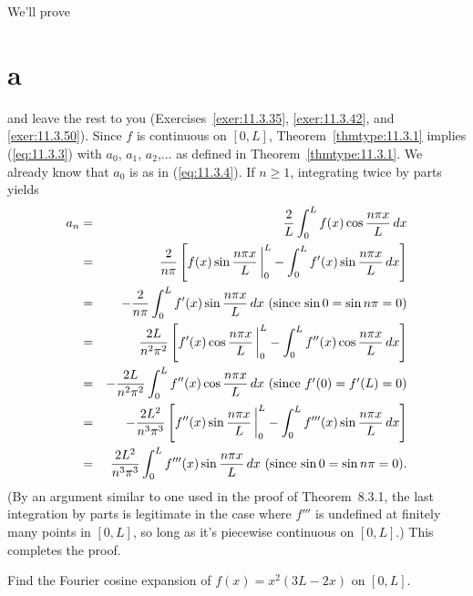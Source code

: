 \proof We'll prove \part{a} and leave the rest to you (Exercises~\ref{exer:11.3.35},
\ref{exer:11.3.42}, and \ref{exer:11.3.50}). Since $f$ is continuous on $[0,L]$,
Theorem~\ref{thmtype:11.3.1} implies (\ref{eq:11.3.3}) with $a_{0}$, $a_{1}$, $a_{2}$,... as defined
in Theorem~\ref{thmtype:11.3.1}. We already know that $a_{0}$ is as in (\ref{eq:11.3.4}). If
$n\ge1$, integrating twice by parts yields
\begin{eqnarray*}
  a_{n} & = & \frac{2}{L}\int_{0}^{L}f(x)\cos\frac{n\pi x}{L}\,dx                                                                    \\
        & = & \frac{2}{n\pi}\left[f(x)\sin\frac{n\pi x}{L}\,\bigg|_{0}^{L}-\int_{0}^{L}f'(x)\sin\frac{n\pi x}{L}\,dx\right]                   \\
        & = & -\frac{2}{n\pi}\int_{0}^{L}f'(x)\sin\frac{n\pi x}{L}\,dx\mbox{ (since $\sin0=\sin n\pi=0$)}                            \\
        & = & \frac{2L}{n^{2}\pi^{2}}\left[f'(x)\cos\frac{n\pi x}{L}\,\bigg|_{0}^{L}-\int_{0}^{L}f''(x)\cos\frac{n\pi x}{L}\,dx\right]        \\
        & = & -\frac{2L}{n^{2}\pi^{2}}\int_{0}^{L}f''(x)\cos\frac{n\pi x}{L}\,dx\mbox{ (since $f'(0)=f'(L)=0$)}                      \\
        & = & -\frac{2L^{2}}{n^{3}\pi^{3}}\left[f''(x)\sin\frac{n\pi x}{L}\,\bigg|_{0}^{L}-\int_{0}^{L}f'''(x)\sin\frac{n\pi x}{L}\,dx\right] \\
        & = & \frac{2L^{2}}{n^{3}\pi^{3}}\int_{0}^{L}f'''(x)\sin\frac{n\pi x}{L}\,dx\mbox{ (since $\sin0=\sin n\pi=0$).}
\end{eqnarray*}
(By an argument similar to one used in the proof of Theorem~8.3.1, the last integration by parts is
legitimate in the case where $f'''$ is undefined at finitely many points in $[0,L]$, so long as it's
piecewise continuous on $[0,L]$.) This completes the proof.

\begin{example}
  \label{example:11.3.5} \rm Find the Fourier cosine expansion of $f(x)=x^{2}(3L-2x)$ on $[0,L]$.
\end{example}

